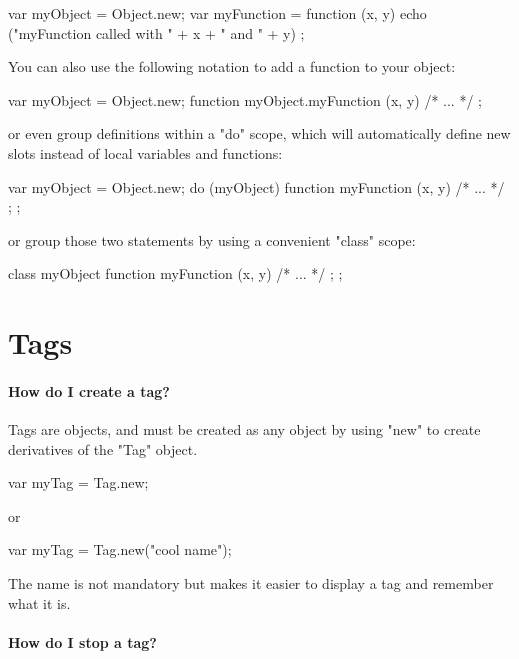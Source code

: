 \begin{urbifixme}
var myObject = Object.new;
var myFunction = function (x, y)
  { echo ("myFunction called with " + x + " and " + y) };
\end{urbifixme}

You can also use the following notation to add a function to your
object:

\begin{urbifixme}
var myObject = Object.new;
function myObject.myFunction (x, y) { /* ... */ };
\end{urbifixme}

or even group definitions within a "do" scope, which will automatically
define new slots instead of local variables and functions:

\begin{urbifixme}
var myObject = Object.new;
do (myObject) {
  function myFunction (x, y) { /* ... */ };
};
\end{urbifixme}

or group those two statements by using a convenient "class" scope:

\begin{urbifixme}
class myObject {
  function myFunction (x, y) { /* ... */ };
};
\end{urbifixme}

\section{Tags}

\paragraph{How do I create a tag?}


Tags are objects, and must be created as any object by using "new" to create
derivatives of the "Tag" object.

\begin{urbifixme}
var myTag = Tag.new;
\end{urbifixme}

or

\begin{urbifixme}
var myTag = Tag.new("cool name");
\end{urbifixme}

The name is not mandatory but makes it easier to display a tag and remember
what it is.

\paragraph{How do I stop a tag?}


